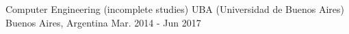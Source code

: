 

\begin{cventries}

    \cventry
    {Computer Engineering (incomplete studies)} %
    {UBA (Universidad de Buenos Aires)} %
    {Buenos Aires, Argentina} %
    {Mar. 2014 - Jun 2017}
    {}
\end{cventries}
